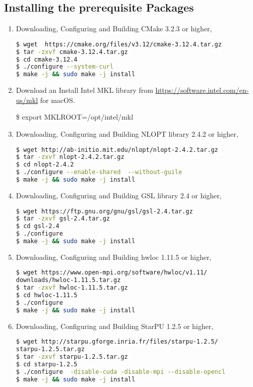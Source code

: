\documentclass[
10pt, %
a4paper, %
oneside, %
headinclude,footinclude, %
BCOR5mm, %
]{scrartcl}
\begin{document}
\subsection{Installing the prerequisite Packages}
\begin{enumerate}
\item
\noindent Downloading, Configuring and Building CMake 3.2.3 or higher,
\begin{lstlisting}[language=bash]
$ wget  https://cmake.org/files/v3.12/cmake-3.12.4.tar.gz
$ tar -zxvf cmake-3.12.4.tar.gz
$ cd cmake-3.12.4
$ ./configure --system-curl
$ make -j && sudo make -j install
\end{lstlisting}

\item

\noindent Download an Install Intel MKL library from \url{https://software.intel.com/en-us/mkl} for macOS.

\noindent \$ export MKLROOT=/opt/intel/mkl

\item
\noindent Downloading, Configuring and Building NLOPT library 2.4.2 or higher,
\begin{lstlisting}[language=bash]
$ wget http://ab-initio.mit.edu/nlopt/nlopt-2.4.2.tar.gz
$ tar -zxvf nlopt-2.4.2.tar.gz
$ cd nlopt-2.4.2
$ ./configure --enable-shared  --without-guile
$ make -j && sudo make -j install
\end{lstlisting}

\item
\noindent Downloading, Configuring and Building GSL library 2.4 or higher,
\begin{lstlisting}[language=bash]
$ wget https://ftp.gnu.org/gnu/gsl/gsl-2.4.tar.gz
$ tar -zxvf gsl-2.4.tar.gz
$ cd gsl-2.4
$ ./configure 
$ make -j && sudo make -j install
\end{lstlisting}

\item
\noindent Downloading, Configuring and Building hwloc 1.11.5 or higher,
\begin{lstlisting}[language=bash]
$ wget https://www.open-mpi.org/software/hwloc/v1.11/
downloads/hwloc-1.11.5.tar.gz
$ tar -zxvf hwloc-1.11.5.tar.gz
$ cd hwloc-1.11.5
$ ./configure
$ make -j && sudo make -j install
\end{lstlisting}

\item
\noindent Downloading, Configuring and Building StarPU 1.2.5 or higher,
\begin{lstlisting}[language=bash]
$ wget http://starpu.gforge.inria.fr/files/starpu-1.2.5/
starpu-1.2.5.tar.gz
$ tar -zxvf starpu-1.2.5.tar.gz
$ cd starpu-1.2.5
$ ./configure  -disable-cuda -disable-mpi --disable-opencl
$ make -j && sudo make -j install
\end{lstlisting}


\end{enumerate}
\end{document}
